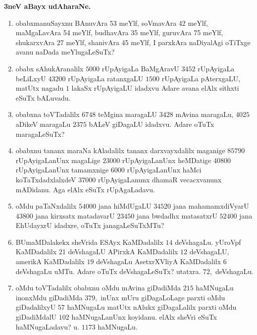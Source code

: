 \eject

\begin{center}
{\large\bf 3neV aBayx udAharaNe.}
\end{center}

\begin{enumerate}[\rm (1)]
\itemsep=2pt
\item obabxmanuSayxnu BAnuvAra {\rm53} meYlf, soVmavAra {\rm 42} meYlf, maMgaLavAra {\rm 54} meYlf, budhavAra {\rm 35} meYlf, guruvAra {\rm75} meYlf, shukarxvAra {\rm 27} meYlf, shanivAra {\rm 45} meYlf, I parxkAra naDiyalAgi oTiTxge avanu naDada meYlugaLeSuTx?

\item obabx sAhukAranalilx $5000$ rUpAyigaLa BaMgAravU $3452$ rUpAyigaLa beLiLxyU $43200$ rUpAyigaLa ratanxgaLU $1500$ rUpAyigaLa pAterxgaLU, matUtx nagadu $1$ lakaSx rUpAyigaLU idadxvu Adare avana elAlx sithxti eSuTx bALuvadu.

\item obabxna toVTadalilx $6748$ teMgina maragaLU $3428$ mAvina maragaLu, $4025$ aDikeV maragaLu $2375$ bALeV giDagaLU idadxvu. Adare oTuTx maragaLeSuTx?

\item obabxnu tananx maraNa kAladalilx tananx darxvayxdalilx maganige $85790$ rUpAyigaLanUnx magaLige $23000$ rUpAyigaLanUnx heMDatige $40800$ rUpAyigaLanUnx tamamxnige $6000$ rUpAyigaLanUnx haMci koTaTxdadxlalxdeV $37000$ rUpAyigaLanunx dhamaR vecacxvanunx mADidanu. Aga elAlx eSuTx rUpAgaLadavu.

\item oMdu paTaNxdalilx $54000$ jana hiMdUgaLU $34520$ jana mahamamxdiVyarU $43800$ jana kirxsatx matadavarU $23450$ jana bwdadhx matasatxrU $52400$ jana EhUdayxrU idadxre, oTuTx janagaLeSuTxMTu?

\item BUmaMDalakekx sheVrida ESAyx KaMDadalilx $14$ deVshagaLu. yUroVpf KaMDadalilx $21$ deVshagaLU APirxkA KaMDadalilx $12$ deVshagaLU, amerikA KaMDadalilx $19$ deVshagaLu AsetxrXVliyA KaMDadalilx $6$ deVshagaLu uMTu. Adare oTuTx deVshagaLeSuTx? \hfill{utatxra. $72,$ deVshagaLu.}

\item oMdu toVTadalilx obabxnu oMdu mAvina giDadiMda $215$ haMNugaLu inonxMdu giDadiMda $379,$ inUnx mUru giDagaLoLage parxti oMdu giDadalilxyU $57$ haMNugaLu matUtx nAlukx giDagaLalilx parxti oMdu giDadiMdalU $102$ haMNugaLanUnx koyidanu. elAlx sheVri eSuTx haMNugaLadavu? \hfill{u. $1173$ haMNugaLu.}


\end{enumerate}
